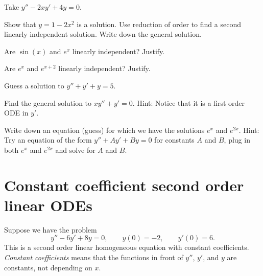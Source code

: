 \begin{exercise}
Take 
$y''-2xy' + 4y = 0$.
\begin{tasks}
\task Show that $y=1-2x^2$ is a solution.  
\task Use reduction of order to find a second linearly independent solution.
\task Write down the general solution.
\end{tasks}
\end{exercise}

\setcounter{exercise}{100}

\begin{exercise}
Are $\sin(x)$ and $e^x$ linearly independent?  Justify.
\end{exercise}

\begin{exercise}
Are $e^x$ and $e^{x+2}$ linearly independent?  Justify.
\end{exercise}

\begin{exercise}
Guess a solution to $y'' + y' + y= 5$.
\end{exercise}

\begin{exercise}
Find the general solution to
$x y'' + y' = 0$.  Hint: Notice that it is a first order ODE in $y'$.
\end{exercise}

\begin{exercise}
Write down an equation (guess) for which we have the solutions
$e^x$ and $e^{2x}$.  Hint: Try an equation of the form
$y''+Ay'+By = 0$ for constants $A$ and $B$,
plug in both $e^x$ and $e^{2x}$ and solve for $A$ and $B$.
\end{exercise}



\sectionnewpage
\section{Constant coefficient second order linear ODEs}
\label{sec:ccsol}


Suppose we have the problem
\begin{equation*}
y''-6y'+8y = 0, \qquad y(0) = - 2, \qquad y'(0) = 6 .
\end{equation*}
This is a second order linear homogeneous equation with constant
coefficients.  \emph{Constant coefficients}
means that the functions 
in front of $y''$, $y'$, and $y$ are constants, not depending on $x$.

